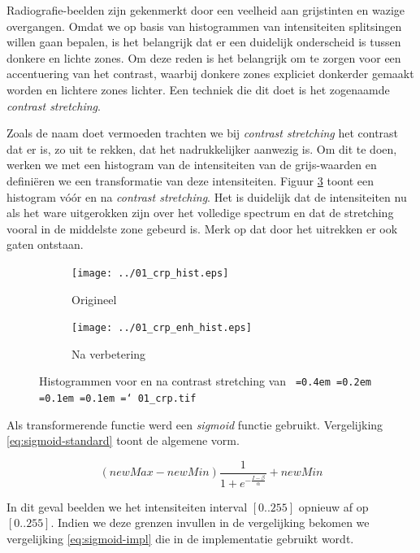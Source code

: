 \documentclass[10pt,a4paper]{article}
\newcommand*\justify{%
  \fontdimen2\font=0.4em%
  \fontdimen3\font=0.2em%
  \fontdimen4\font=0.1em%
  \fontdimen7\font=0.1em%
  \hyphenchar\font=`\-%
}
\newcommand{\ttt}[1]{{\tt \justify{#1}}}
\begin{document}
Radiografie-beelden zijn gekenmerkt door een veelheid aan grijstinten en wazige overgangen. Omdat we op basis van histogrammen van intensiteiten splitsingen willen gaan bepalen, is het belangrijk dat er een duidelijk onderscheid is tussen donkere en lichte zones. Om deze reden is het belangrijk om te zorgen voor een accentuering van het contrast, waarbij donkere zones expliciet donkerder gemaakt worden en lichtere zones lichter. Een techniek die dit doet is het zogenaamde \emph{contrast stretching}.

Zoals de naam doet vermoeden trachten we bij \emph{contrast stretching} het contrast dat er is, zo uit te rekken, dat het nadrukkelijker aanwezig is. Om dit te doen, werken we met een histogram van de intensiteiten van de grijs-waarden en defini\"eren we een transformatie van deze intensiteiten. Figuur \ref{fig:contrast-stretching} toont een histogram v\'o\'or en na \emph{contrast stretching}. Het is duidelijk dat de intensiteiten nu als het ware uitgerokken zijn over het volledige spectrum en dat de stretching vooral in de middelste zone gebeurd is. Merk op dat door het uitrekken er ook gaten ontstaan.

\begin{figure}
\centering
\begin{subfigure}{.49\textwidth}
  \centering
  \texttt{[image: ../01\_crp\_hist.eps]}
  \caption{Origineel}
  \label{fig:original-histogram}
\end{subfigure}
\begin{subfigure}{.49\textwidth}
  \centering
  \texttt{[image: ../01\_crp\_enh\_hist.eps]}
  \caption{Na verbetering}
  \label{fig:enhanced-histogram}
\end{subfigure}
\caption{Histogrammen voor en na contrast stretching van \ttt{01\_crp.tif}}
\label{fig:contrast-stretching}
\end{figure}

Als transformerende functie werd een \emph{sigmoid} functie gebruikt. Vergelijking \ref{eq:sigmoid-standard} toont de algemene vorm.

\begin{equation} \label{eq:sigmoid-standard}
(newMax - newMin) \frac{1}{1+e^{-\frac{I - \beta}{\alpha}}} + newMin
\end{equation}

In dit geval beelden we het intensiteiten interval $[0..255]$ opnieuw af op $[0..255]$. Indien we deze grenzen invullen in de vergelijking bekomen we vergelijking \ref{eq:sigmoid-impl} die in de implementatie gebruikt wordt.
\end{document}
